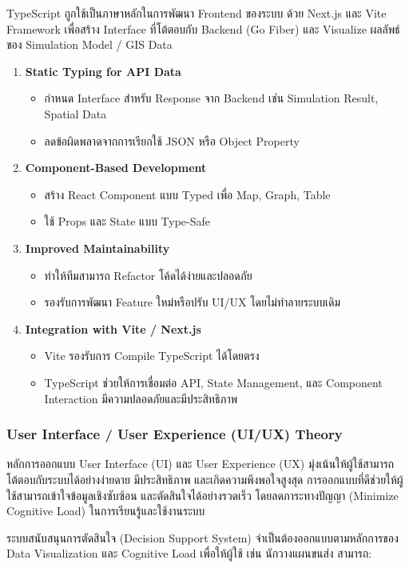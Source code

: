 TypeScript ถูกใช้เป็นภาษาหลักในการพัฒนา Frontend ของระบบ ด้วย Next.js และ Vite Framework เพื่อสร้าง Interface ที่โต้ตอบกับ Backend (Go Fiber) และ Visualize ผลลัพธ์ของ Simulation Model / GIS Data
\begin{enumerate}
    \item \textbf{Static Typing for API Data}
    \begin{itemize}
        \item กำหนด Interface สำหรับ Response จาก Backend เช่น Simulation Result, Spatial Data
        \item ลดข้อผิดพลาดจากการเรียกใช้ JSON หรือ Object Property
    \end{itemize}
    
    \item \textbf{Component-Based Development}
    \begin{itemize}
        \item สร้าง React Component แบบ Typed เพื่อ Map, Graph, Table
        \item ใช้ Props และ State แบบ Type-Safe
    \end{itemize}
    
    \item \textbf{Improved Maintainability}
    \begin{itemize}
        \item ทำให้ทีมสามารถ Refactor โค้ดได้ง่ายและปลอดภัย
        \item รองรับการพัฒนา Feature ใหม่หรือปรับ UI/UX โดยไม่ทำลายระบบเดิม
    \end{itemize}
    
    \item \textbf{Integration with Vite / Next.js}
    \begin{itemize}
        \item Vite รองรับการ Compile TypeScript ได้โดยตรง
        \item TypeScript ช่วยให้การเชื่อมต่อ API, State Management, และ Component Interaction มีความปลอดภัยและมีประสิทธิภาพ
    \end{itemize}
\end{enumerate}

\subsubsection{User Interface / User Experience (UI/UX) Theory}
\begin{mypara}
    \indent หลักการออกแบบ User Interface (UI) และ User Experience (UX) มุ่งเน้นให้ผู้ใช้สามารถโต้ตอบกับระบบได้อย่างง่ายดาย
    มีประสิทธิภาพ และเกิดความพึงพอใจสูงสุด การออกแบบที่ดีช่วยให้ผู้ใช้สามารถเข้าใจข้อมูลเชิงซับซ้อน
    และตัดสินใจได้อย่างรวดเร็ว โดยลดภาระทางปัญญา (Minimize Cognitive Load) ในการเรียนรู้และใช้งานระบบ

    \indent ระบบสนับสนุนการตัดสินใจ (Decision Support System) จำเป็นต้องออกแบบตามหลักการของ Data Visualization
    และ Cognitive Load เพื่อให้ผู้ใช้ เช่น นักวางแผนขนส่ง สามารถ:
\end{mypara}

